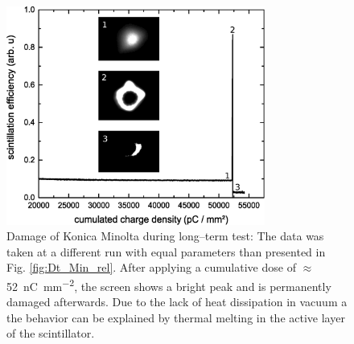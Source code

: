 \documentclass[%
preprint,
amsmath,
amssymb,
aip,
rsi, 
numerical,
floatfix,
]{revtex4-1}
\begin{document}
\begin{figure}
\includegraphics[width=8.5cm]{./Figures/Damage}%
\caption{\label{fig:Damage} Damage of Konica Minolta during long--term test: 
The data was taken at a different run with equal parameters than presented in Fig. \ref{fig:Dt_Min_rel}. 
After applying a cumulative dose of $\approx$ \SI[per-mode=symbol]{52}{\nano \coulomb \per \square \milli \meter}, the screen shows a bright peak and is permanently damaged afterwards. 
Due to the lack of heat dissipation in vacuum a the behavior can be explained by thermal melting in the active layer of the scintillator.}
\end{figure}
\end{document}
